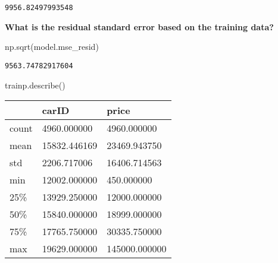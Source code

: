 \documentclass[
  letterpaper,
  DIV=11,
  numbers=noendperiod]{scrreprt}
\newenvironment{Shaded}{\begin{snugshade}}{\end{snugshade}}
\newcommand{\BuiltInTok}[1]{\textcolor[rgb]{0.00,0.23,0.31}{#1}}
\newcommand{\DecValTok}[1]{\textcolor[rgb]{0.68,0.00,0.00}{#1}}
\newcommand{\NormalTok}[1]{\textcolor[rgb]{0.00,0.23,0.31}{#1}}
\newcommand{\OperatorTok}[1]{\textcolor[rgb]{0.37,0.37,0.37}{#1}}
\newcommand{\SpecialCharTok}[1]{\textcolor[rgb]{0.37,0.37,0.37}{#1}}
\newcommand{\StringTok}[1]{\textcolor[rgb]{0.13,0.47,0.30}{#1}}
\begin{document}
\begin{verbatim}
9956.82497993548
\end{verbatim}

\textbf{What is the residual standard error based on the training data?}

\begin{Shaded}
\begin{Highlighting}[]
\NormalTok{np.sqrt(model.mse\_resid)}
\end{Highlighting}
\end{Shaded}

\begin{verbatim}
9563.74782917604
\end{verbatim}

\begin{Shaded}
\begin{Highlighting}[]
\NormalTok{trainp.describe()}
\end{Highlighting}
\end{Shaded}

\begin{longtable}[]{@{}lll@{}}
\toprule\noalign{}
& carID & price \\
\midrule\noalign{}
\endhead
\bottomrule\noalign{}
\endlastfoot
count & 4960.000000 & 4960.000000 \\
mean & 15832.446169 & 23469.943750 \\
std & 2206.717006 & 16406.714563 \\
min & 12002.000000 & 450.000000 \\
25\% & 13929.250000 & 12000.000000 \\
50\% & 15840.000000 & 18999.000000 \\
75\% & 17765.750000 & 30335.750000 \\
max & 19629.000000 & 145000.000000 \\
\end{longtable}

\begin{Shaded}
\end{Shaded}
\end{document}
